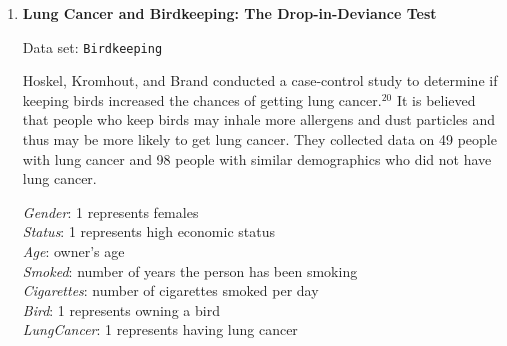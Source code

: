\documentclass[
]{report}
\begin{document}
\begin{enumerate}
  \begin{enumerate}
    \item Create a logistic regression model using \texttt{Method, Gender,} and \texttt{Depth} to estimate the probability that a tattoo was removed successfully. Based on Wald’s test, which variables appear to be significant? Based on the likelihood ratio test ($\scriptstyle H_0$: $\scriptstyle \beta_1 \ = \ \beta_2 \ =\  \beta_3$ = 0 versus $\scriptstyle H_a$: at least one of the coefficients is not zero), can we conclude that at least one of these terms is significant?
    \item Create a logistic regression model using only \texttt{Gender} and \texttt{Depth} to estimate the probability that a tattoo was removed successfully. Based on Wald’s test, which variables appear to be significant? Based on the likelihood ratio test, can we conclude that at least one of these terms is significant?
    \item Use the drop-in-deviance test to compare the models in Parts (a) and (b). Can you conclude that \texttt{Method} is related to the probability of success?
    \item Construct a model using only \texttt{Method} to predict the probability of a successful removal. What do Wald’s test and likelihood ratio test reveal?
    \item Explain why the drop-in-deviance test in Part (c) is better than the approach in Part (d) for determining if \texttt{Method} is related to the probability of a successful tattoo removal.
  \end{enumerate}

  \item \textbf{Lung Cancer and Birdkeeping: The Drop-in-Deviance Test}

Data set: \texttt{Birdkeeping}

Hoskel, Kromhout, and Brand conducted a case-control study to determine if keeping birds increased the chances of getting lung cancer.$^{20}$ It is believed that people who keep birds may inhale more allergens and dust particles and thus may be more likely to get lung cancer. They collected data on 49 people with lung cancer and 98 people with similar demographics who did not have lung cancer.

\textit{Gender}: 1 represents females \\
\textit{Status}: 1 represents high economic status \\
\textit{Age}: owner’s age \\
\textit{Smoked}: number of years the person has been smoking \\
\textit{Cigarettes}: number of cigarettes smoked per day \\
\textit{Bird}: 1 represents owning a bird \\
\textit{LungCancer}: 1 represents having lung cancer


\end{enumerate}
\end{document}
